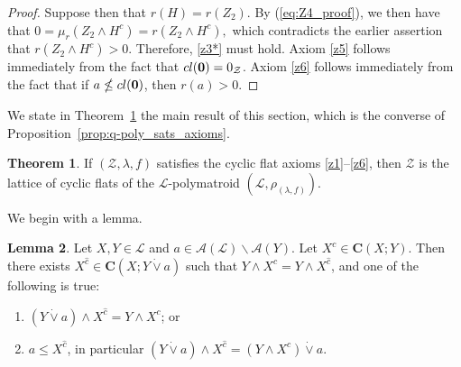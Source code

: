 \documentclass[a4paper,11pt,reqno]{article}
\theoremstyle{definition}
\newtheorem{theorem}{Theorem}[section]
\newtheorem{lemma}[theorem]{{{Lemma}}}
\newcommand{\mA}{\mathcal{A}}
\newcommand{\zero}{{\mathbf{0}}}
\begin{document}
\begin{proof}
        Suppose then that $r(H)=r(Z_2)$. By (\ref{eq:Z4_proof}), we then have that 
        $0=\mu_r(Z_2\wedge H^c)=r(Z_2\wedge H^c),$
        which contradicts the earlier assertion that $r(Z_2\wedge H^c)>0$. Therefore, \ref{z3*} must hold. Axiom \ref{z5} follows immediately from the fact that $\textup{cl}(\zero)=0_\mathcal{Z}$. Axiom \ref{z6} follows immediately from the fact that if $a \nleq \textup{cl}(\zero)$, then $r(a)>0$.
\end{proof}

We state in Theorem~\ref{th:main} the main result of this section, which is the converse of Proposition~\ref{prop:q-poly_sats_axioms}.

\begin{theorem}\label{th:main}
    If $(\mathcal{Z},\lambda,f)$ satisfies the cyclic flat axioms \ref{z1}--\ref{z6}, then $\mathcal{Z}$ is the lattice of cyclic flats of the $\mathcal{L}$-polymatroid $(\mathcal{L},\rho_{(\lambda,f)})$.
\end{theorem}

We begin with a lemma.

\begin{lemma}\label{lem:two_cases}
    Let $X,Y \in \mathcal{L}$ and $a \in \mA(\mathcal{L}) \backslash \mA(Y)$. Let $X^c \in \mathbf{C}(X;Y)$. Then there exists $X^{\hat{c}} \in \mathbf{C}(X; Y \dot\vee a)$ such that $Y \wedge X^c = Y \wedge X^{\hat{c}}$, and one of the following is true:
    \begin{enumerate}
        \item $(Y \dot\vee a) \wedge X^{\hat{c}} = Y \wedge X^c$; or
        \item $a \leq X^{\hat{c}}$, in particular $(Y \dot\vee a) \wedge X^{\hat{c}} = (Y \wedge X^c) \dot\vee a$.
    \end{enumerate}
\end{lemma}
\end{document}
